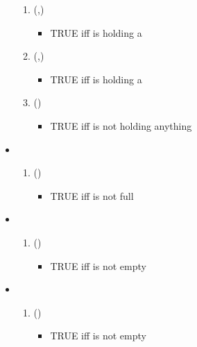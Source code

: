 \begin{itemize}
\begin{enumerate}[resume]
        \item {}(,) 
            \begin{itemize}
                \item TRUE iff  is holding a 
            \end{itemize}
    
        \item {}(,) 
            \begin{itemize}
                \item TRUE iff  is holding a 
            \end{itemize}
    
        \item {}() 
            \begin{itemize}
                \item TRUE iff  is not holding anything
            \end{itemize}
    \end{enumerate}

\item {}
    \begin{enumerate}[resume]
        \item {}() 
            \begin{itemize}
                \item TRUE iff  is not full	
            \end{itemize}
  \end{enumerate}

\item {}
    \begin{enumerate}[resume]
        \item {}() 
            \begin{itemize}
                \item TRUE iff  is not empty
            \end{itemize}
    \end{enumerate}

\item {}
    \begin{enumerate}[resume]
        \item {}() 
            \begin{itemize}
                \item TRUE iff  is not empty
            \end{itemize}
    \end{enumerate}


\end{itemize}
